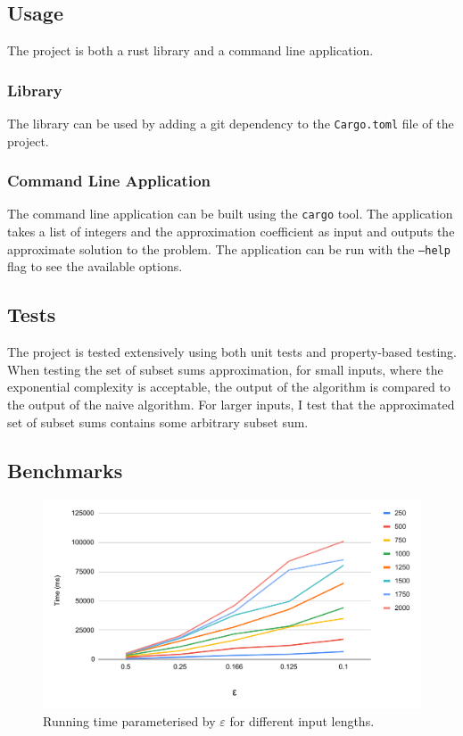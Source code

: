 \subsection{Usage}
The project is both a rust library and a command line application. 
\subsubsection{Library}
The library can be used by adding a git dependency to the \texttt{Cargo.toml} file of the project.
\subsubsection{Command Line Application}
The command line application can be built using the \texttt{cargo} tool. The application takes a list of integers and the approximation coefficient as input and outputs the approximate solution to the \Partition problem. The application can be run with the \texttt{--help} flag to see the available options.

\subsection{Tests}
The project is tested extensively using both unit tests and property-based testing. When testing the set of subset sums approximation, for small inputs, where the exponential complexity is acceptable, the output of the algorithm is compared to the output of the naive algorithm. For larger inputs, I test that the approximated set of subset sums contains some arbitrary subset sum.

\subsection{Benchmarks}
\begin{figure}[h!]
    \centering
    \includegraphics[width=\linewidth]{charts/epsilon.pdf}
    \caption{Running time parameterised by $\varepsilon$ for different input lengths.}
    \label{fig:chart}
\end{figure}

